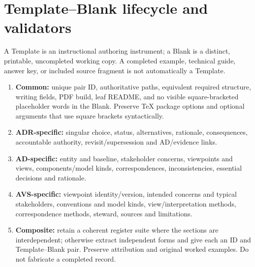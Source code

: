 \documentclass[10pt,letterpaper]{article}
\begin{document}
\section{Template--Blank lifecycle and validators}
A Template is an instructional authoring instrument; a Blank is a distinct,
printable, uncompleted working copy. A completed example, technical guide,
answer key, or included source fragment is not automatically a Template.
\begin{enumerate}
\item \textbf{Common:} unique pair ID, authoritative paths, equivalent required
structure, writing fields, PDF build, leaf README, and no visible square-bracketed
placeholder words in the Blank. Preserve TeX package options and optional
arguments that use square brackets syntactically.
\item \textbf{ADR-specific:} singular choice, status, alternatives, rationale,
consequences, accountable authority, revisit/supersession and AD/evidence links.
\item \textbf{AD-specific:} entity and baseline, stakeholder concerns,
viewpoints and views, components/model kinds, correspondences,
inconsistencies, essential decisions and rationale.
\item \textbf{AVS-specific:} viewpoint identity/version, intended concerns
and typical stakeholders, conventions and model kinds, view/interpretation
methods, correspondence methods, steward, sources and limitations.
\item \textbf{Composite:} retain a coherent register suite where the
sections are interdependent; otherwise extract independent forms and
give each an ID and Template--Blank pair. Preserve attribution and
original worked examples. Do not fabricate a completed record.
\end{enumerate}
\end{document}
